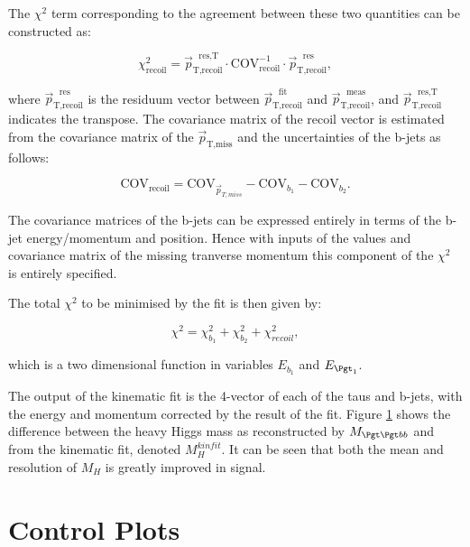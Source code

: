 The $\chi^{2}$ term corresponding to the agreement between these two quantities
can be constructed as:

\begin{equation}
\chi_{\text{recoil}}^{2} = \vec{p}_{\text{T},\text{recoil}}^{\text{~~res},\text{T}} \cdot
\text{COV}_{\text{recoil}}^{-1} \cdot
\vec{p}_{\text{T},\text{recoil}}^{\text{~~res}} ,  
\end{equation}

where $\vec{p}_{\text{T},\text{recoil}}^{\text{~~res}}$ is the residuum vector between
$\vec{p}_{\text{T},\text{recoil}}^{\text{~~fit}}$
and $\vec{p}_{\text{T},\text{recoil}}^{\text{~~meas}}$, and
$\vec{p}_{\text{T},\text{recoil}}^{\text{~~res},\text{T}}$ indicates the
transpose. The covariance matrix of the recoil vector is estimated from
the covariance matrix of the $\vec{p}_{\text{T},\text{miss}}$ and the uncertainties of the b-jets as
follows:

\begin{equation}
\text{COV}_{\text{recoil}} = \text{COV}_{\vec{p}_{T,miss}} - \text{COV}_{b_{1}} -
\text{COV}_{b_{2}} .
\end{equation}

The covariance matrices of the b-jets can be expressed entirely in terms of the
b-jet energy/momentum and position. Hence with inputs of the values and
covariance matrix of the missing tranverse momentum this component of the
$\chi^{2}$ is entirely specified. 

The total $\chi^{2}$ to be minimised by the fit is then given by:

\begin{equation}
\chi^{2}= \chi_{b_{1}}^{2} + \chi_{b_{2}}^{2} + \chi_{recoil}^{2},
\end{equation}

which is a two dimensional function in variables $E_{b_{1}}$ and $E_{\Pgt_{1}}$.

The output of the kinematic fit is the 4-vector of each of the taus and b-jets,
with the energy and momentum corrected by the result of the fit. Figure \ref{}
shows the difference between the heavy Higgs mass as reconstructed by
$M_{\Pgt\Pgt bb}$ and from the kinematic fit, denoted $M_{H}^{kinfit}$. It can
be seen that both the mean and resolution of $M_{H}$ is greatly improved in
signal.

\section{Control Plots}

